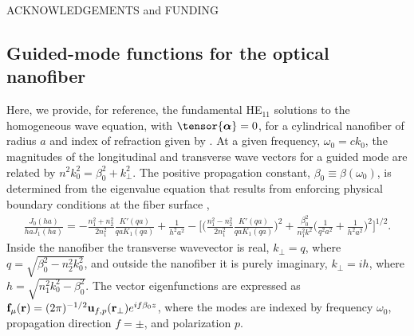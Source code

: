 \documentclass[preprint, aps,pra,onecolumn]{revtex4-1} %
\begin{document}
ACKNOWLEDGEMENTS and FUNDING

%
%




\begin{appendix}	


\section{Guided-mode functions for the optical nanofiber} \label{Appendix::ModeFunctions}


Here, we provide, for reference, the fundamental HE$_{11}$ solutions to the homogeneous wave equation,  with $\tensor{\boldsymbol{\alpha}} = 0$, for a cylindrical nanofiber of radius $a$ and index of refraction given by .  At a given frequency, $\omega_0 = c k_0$, the magnitudes of the longitudinal and transverse wave vectors for a guided mode are related by $n^2 k_0^2 = \beta_0^2 + k_\perp^2$.  
The positive propagation constant, $\beta_0 \equiv \beta(\omega_0)$, is determined from the eigenvalue equation that results from enforcing physical boundary conditions at the fiber surface \cite{Yariv, Marcuse, Snyder and Love},
	\begin{align}
		\frac{J_0(ha)}{ha J_1(ha)} = - \frac{n_1^2+n_2^2}{2n_1^2} \frac{K'(qa)}{qa K_1(qa)} + \frac{1}{h^2 a^2} - \bigg[ \bigg(\frac{n_1^2 - n_2^2}{2 n_1^2} \frac{K'(qa)}{qa K_1(qa)} \bigg)^2  + \frac{\beta_0^2}{n^2_1 k^2} \bigg(\frac{1}{q^2a^2} + \frac{1}{h^2a^2} \bigg)^2 \bigg]^{1/2}.
	\end{align}
Inside the nanofiber the transverse wavevector is real, $k_\perp = q$, where $q=\sqrt{\beta_0^2- n_2^2k_0^2}$, and outside the nanofiber it is purely imaginary, $k_\perp = i h$, where $h=\sqrt{n_1^2 k_0^2 - \beta_0^2}$.  The vector eigenfunctions are expressed as $\mathbf{f}_{\mu}(\mathbf{r}) = (2\pi)^{-1/2}\mathbf{u}_{f,p}(\mathbf{r}_\perp) e^{i f \beta_0 z}$, where the modes are indexed by frequency $\omega_0$, propagation direction $f = \pm$, and polarization $p$.


\end{appendix}
\end{document}
